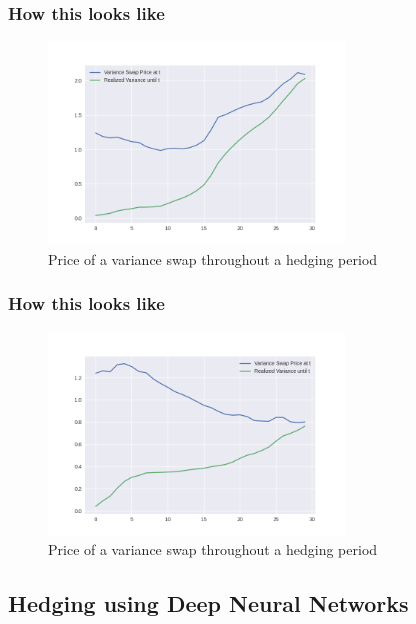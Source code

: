 \documentclass[serif]{beamer}
\begin{document}
\begin{frame}
    \frametitle{How this looks like}
    \begin{figure}
        \includegraphics[width=0.7\textwidth]{./images/var_swap_price1.png}
        \caption{
            Price of a variance swap throughout a hedging period
        }
    \end{figure}
\end{frame}

\begin{frame}
    \frametitle{How this looks like}
    \begin{figure}
        \includegraphics[width=0.7\textwidth]{./images/var_swap_price.png}
        \caption{
            Price of a variance swap throughout a hedging period
        }
    \end{figure}
\end{frame}

\subsection{Hedging using Deep Neural Networks}
\end{document}
